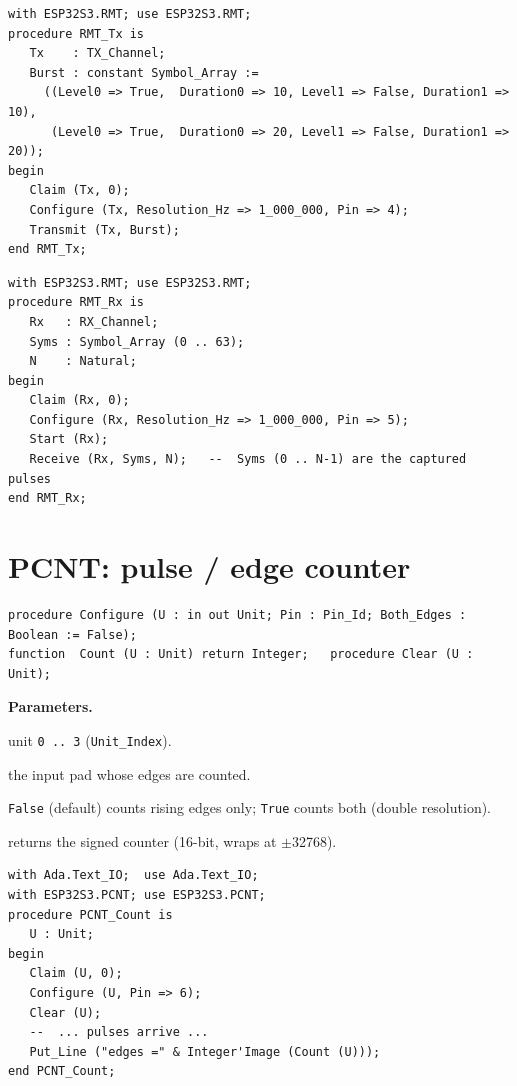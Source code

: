 \begin{lstlisting}
with ESP32S3.RMT; use ESP32S3.RMT;
procedure RMT_Tx is
   Tx    : TX_Channel;
   Burst : constant Symbol_Array :=
     ((Level0 => True,  Duration0 => 10, Level1 => False, Duration1 => 10),
      (Level0 => True,  Duration0 => 20, Level1 => False, Duration1 => 20));
begin
   Claim (Tx, 0);
   Configure (Tx, Resolution_Hz => 1_000_000, Pin => 4);
   Transmit (Tx, Burst);
end RMT_Tx;
\end{lstlisting}

\begin{lstlisting}
with ESP32S3.RMT; use ESP32S3.RMT;
procedure RMT_Rx is
   Rx   : RX_Channel;
   Syms : Symbol_Array (0 .. 63);
   N    : Natural;
begin
   Claim (Rx, 0);
   Configure (Rx, Resolution_Hz => 1_000_000, Pin => 5);
   Start (Rx);
   Receive (Rx, Syms, N);   --  Syms (0 .. N-1) are the captured pulses
end RMT_Rx;
\end{lstlisting}

\section{PCNT: pulse / edge counter}

\begin{lstlisting}
procedure Configure (U : in out Unit; Pin : Pin_Id; Both_Edges : Boolean := False);
function  Count (U : Unit) return Integer;   procedure Clear (U : Unit);
\end{lstlisting}

\textbf{Parameters.}
\begin{description}[style=nextline]
\item[\texttt{Index}] unit \texttt{0\,..\,3} (\texttt{Unit\_Index}).
\item[\texttt{Pin}] the input pad whose edges are counted.
\item[\texttt{Both\_Edges}] \texttt{False} (default) counts rising edges only;
  \texttt{True} counts both (double resolution).
\item[\texttt{Count}] returns the signed counter (16-bit, wraps at $\pm$32768).
\end{description}

\begin{lstlisting}
with Ada.Text_IO;  use Ada.Text_IO;
with ESP32S3.PCNT; use ESP32S3.PCNT;
procedure PCNT_Count is
   U : Unit;
begin
   Claim (U, 0);
   Configure (U, Pin => 6);
   Clear (U);
   --  ... pulses arrive ...
   Put_Line ("edges =" & Integer'Image (Count (U)));
end PCNT_Count;
\end{lstlisting}


